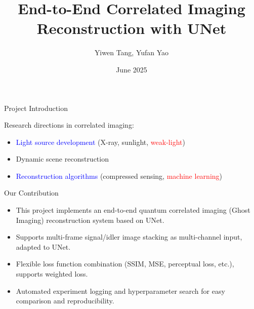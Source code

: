 \documentclass{beamer}
\title{End-to-End Correlated Imaging Reconstruction with UNet}
\author{Yiwen Tang, Yufan Yao}
\date{June 2025}
\begin{document}
\frame{\titlepage}


\begin{frame}{Project Introduction}
\begin{block}{Research directions in correlated imaging:}
\begin{itemize}
    \begin{itemize}
        \item \textcolor{blue}{Light source development} (X-ray, sunlight, \textcolor{red}{weak-light})
        \item Dynamic scene reconstruction
        \item \textcolor{blue}{Reconstruction algorithms} (compressed sensing, \textcolor{red}{machine learning})
    \end{itemize}
   
\end{itemize}
\end{block}
\begin{block}{Our Contribution}
\begin{itemize}
    \item This project implements an end-to-end quantum correlated imaging (Ghost Imaging) reconstruction system based on UNet.
    \item Supports multi-frame signal/idler image stacking as multi-channel input, adapted to UNet.
    \item Flexible loss function combination (SSIM, MSE, perceptual loss, etc.), supports weighted loss.
    \item Automated experiment logging and hyperparameter search for easy comparison and reproducibility.
\end{itemize}
\end{block}

\end{frame}
\end{document}

